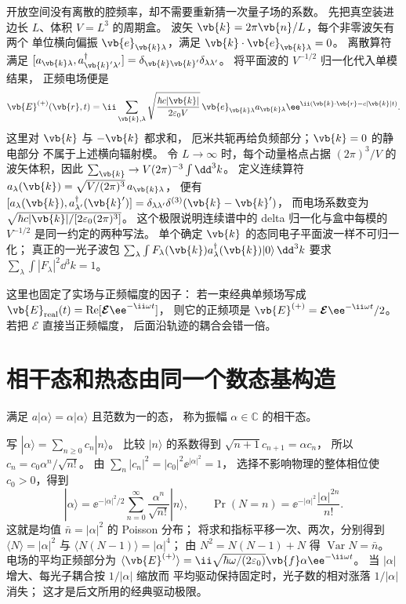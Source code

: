 开放空间没有离散的腔频率，却不需要重新猜一次量子场的系数。
先把真空装进边长 \(L\)、体积 \(V=L^3\) 的周期盒。
波矢 \(\vb{k}=2\pi\vb{n}/L\)，每个非零波矢有两个
单位横向偏振 \(\vb{e}_{\vb{k}\lambda}\)，满足
\(\vb{k}\cdot\vb{e}_{\vb{k}\lambda}=0\)。
离散算符满足
\([a_{\vb{k}\lambda},a_{\vb{k}'\lambda'}^\dagger]
=\delta_{\vb{k}\vb{k}'}\delta_{\lambda\lambda'}\)。
将平面波的 \(V^{-1/2}\) 归一化代入单模结果，
正频电场便是
\[
\vb{E}^{(+)}(\vb{r},t)
=\ii\sum_{\vb{k},\lambda}
\sqrt{\frac{\hbar c|\vb{k}|}{2\varepsilon_0 V}}\,
\vb{e}_{\vb{k}\lambda}a_{\vb{k}\lambda}
\ee^{\ii(\vb{k}\cdot\vb{r}-c|\vb{k}|t)}.
\]
这里对 \(\vb{k}\) 与 \(-\vb{k}\) 都求和，
厄米共轭再给负频部分；\(\vb{k}=0\) 的静电部分
不属于上述横向辐射模。
令 \(L\to\infty\) 时，每个动量格点占据
\((2\pi)^3/V\) 的波矢体积，因此
\(\sum_{\vb{k}}\to V(2\pi)^{-3}\int\dd^3k\)。
定义连续算符
\(a_\lambda(\vb{k})
=\sqrt{V/(2\pi)^3}\,a_{\vb{k}\lambda}\)，
便有
\([a_\lambda(\vb{k}),a_{\lambda'}^\dagger(\vb{k}')]
=\delta_{\lambda\lambda'}\delta^{(3)}(\vb{k}-\vb{k}')\)，
而电场系数变为
\(\sqrt{\hbar c|\vb{k}|/[2\varepsilon_0(2\pi)^3]}\)。
这个极限说明连续谱中的 delta 归一化与盒中每模的
\(V^{-1/2}\) 是同一约定的两种写法。
单个确定 \(\vb{k}\) 的态同电子平面波一样不可归一化；
真正的一光子波包
\(\sum_\lambda\int F_\lambda(\vb{k})
a_\lambda^\dagger(\vb{k})|0\rangle\,\dd^3k\)
要求 \(\sum_\lambda\int|F_\lambda|^2\dd^3k=1\)。

这里也固定了实场与正频幅度的因子：
若一束经典单频场写成
\(\vb{E}_{\rm real}(t)
=\operatorname{Re}[\boldsymbol{\mathcal E}\ee^{-\ii\omega t}]\)，
则它的正频项是
\(\vb{E}^{(+)}=\boldsymbol{\mathcal E}
\ee^{-\ii\omega t}/2\)。
若把 \(\boldsymbol{\mathcal E}\) 直接当正频幅度，
后面沿轨迹的耦合会错一倍。

\section{相干态和热态由同一个数态基构造}
\label{sec:feqo-coherent-thermal}

\begin{definition}[相干态]
满足 \(a|\alpha\rangle=\alpha|\alpha\rangle\) 且范数为一的态，
称为振幅 \(\alpha\in\mathbb C\) 的相干态。
\end{definition}

写 \(|\alpha\rangle=\sum_{n\ge0}c_n|n\rangle\)。
比较 \(|n\rangle\) 的系数得到
\(\sqrt{n+1}c_{n+1}=\alpha c_n\)，
所以 \(c_n=c_0\alpha^n/\sqrt{n!}\)。
由 \(\sum_n|c_n|^2=|c_0|^2\ee^{|\alpha|^2}=1\)，
选择不影响物理的整体相位使 \(c_0>0\)，得到
\begin{equation}
|\alpha\rangle
=\ee^{-|\alpha|^2/2}
\sum_{n=0}^\infty\frac{\alpha^n}{\sqrt{n!}}|n\rangle,
\qquad
\Pr(N=n)=\ee^{-|\alpha|^2}\frac{|\alpha|^{2n}}{n!}.
\label{eq:feqo-coherent-state}
\end{equation}
这就是均值 \(\bar n=|\alpha|^2\) 的 Poisson 分布；
将求和指标平移一次、两次，分别得到
\(\langle N\rangle=|\alpha|^2\) 与
\(\langle N(N-1)\rangle=|\alpha|^4\)；
由 \(N^2=N(N-1)+N\) 得
\(\operatorname{Var}N=\bar n\)。
电场的平均正频部分为
\(\langle\vb{E}^{(+)}\rangle
=\ii\sqrt{\hbar\omega/(2\varepsilon_0)}
\vb{f}\alpha\ee^{-\ii\omega t}\)。
当 \(|\alpha|\) 增大、每光子耦合按 \(1/|\alpha|\) 缩放而
平均驱动保持固定时，光子数的相对涨落 \(1/|\alpha|\) 消失；
这才是后文所用的经典驱动极限。


